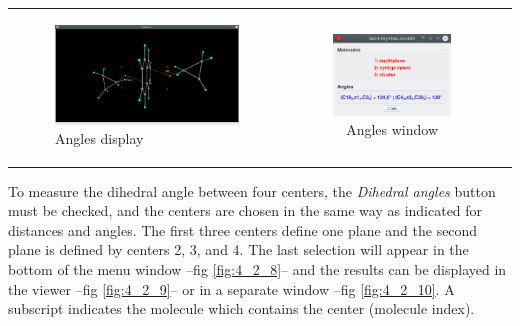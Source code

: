 \documentclass[10pt]{article}
\begin{document}
\begin{tabular}{lcr}
\begin{minipage}{.45\linewidth}
\begin{figure}[H]
\begin{center}
            \includegraphics[width=1\linewidth]{damqt320_angles_2.png}
        \end{center}
        \vspace*{1mm}
        \caption{Angles display \label{fig:4_2_6}}
    \end{figure}
\end{minipage}
&
\begin{minipage}{.25\linewidth}
    \begin{figure}[H]
        \begin{center}
            \vspace*{0mm}
            \includegraphics[width=0.8\linewidth]{damqt320_angles_3.png}
        \end{center}
        \vspace*{17mm}
        \caption{Angles window \label{fig:4_2_7}}
    \end{figure}
\end{minipage}
\end{tabular}

\vspace*{5mm}

To measure the dihedral angle between four centers, 
the {\it Dihedral angles} 
button must be checked, and the centers are chosen in the same way as indicated for 
distances and angles. The first three centers define one plane and the second plane is 
defined by centers 2, 3, and 4.
The last selection will appear in the bottom of the menu window --fig \ref{fig:4_2_8}-- 
and the results can be displayed in the viewer --fig \ref{fig:4_2_9}-- 
or in a separate window --fig \ref{fig:4_2_10}.
A subscript indicates the molecule which contains the center (molecule 
index).
\end{document}
